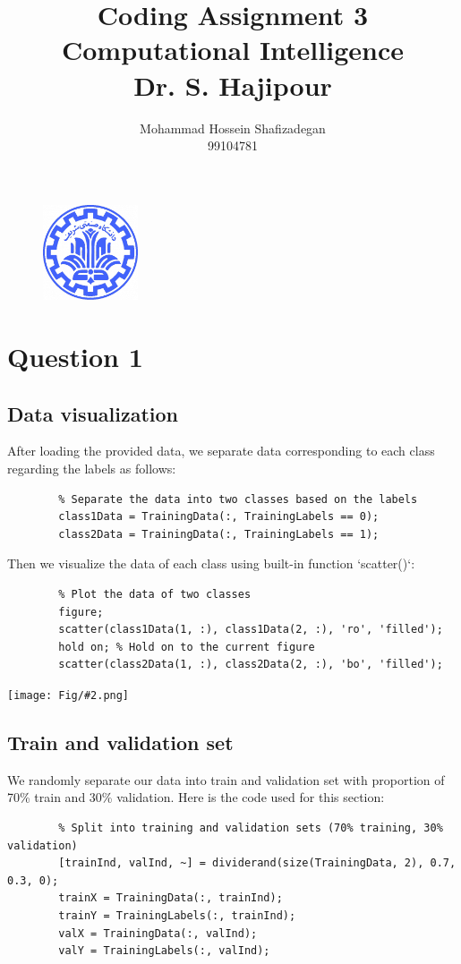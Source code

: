 \documentclass[]{article}
\author{
	Mohammad Hossein Shafizadegan\\
	99104781
}
\title{
	Coding Assignment 3 \\
	Computational Intelligence  \\
	Dr. S. Hajipour
}
\newcommand{\pict}[2]{\begin{center}
		\texttt{[image: Fig/\#2.png]}
\end{center}}
\begin{document}
	\begin{figure}
		\includegraphics[width=0.25\textwidth]{Fig/Sharif.png}
		\centering
	\end{figure}
	\maketitle
	\tableofcontents
	\newpage
	\section{Question 1}
	\subsection{Data visualization}
	After loading the provided data, we separate data corresponding to each class regarding the labels as follows:
	\begin{lstlisting}
		% Separate the data into two classes based on the labels
		class1Data = TrainingData(:, TrainingLabels == 0);
		class2Data = TrainingData(:, TrainingLabels == 1);
	\end{lstlisting}
	Then we visualize the data of each class using built-in function `scatter()`:
	\begin{lstlisting}
		% Plot the data of two classes
		figure;
		scatter(class1Data(1, :), class1Data(2, :), 'ro', 'filled');
		hold on; % Hold on to the current figure
		scatter(class2Data(1, :), class2Data(2, :), 'bo', 'filled');
	\end{lstlisting}
	\pict{0.6}{F1}
	
	\subsection{Train and validation set}
	We randomly separate our data into train and validation set with proportion of 70\% train and 30\% validation. Here is the code used for this section:
	\begin{lstlisting}
		% Split into training and validation sets (70% training, 30% validation)
		[trainInd, valInd, ~] = dividerand(size(TrainingData, 2), 0.7, 0.3, 0);
		trainX = TrainingData(:, trainInd);
		trainY = TrainingLabels(:, trainInd);
		valX = TrainingData(:, valInd);
		valY = TrainingLabels(:, valInd);
	\end{lstlisting} 
\end{document}
